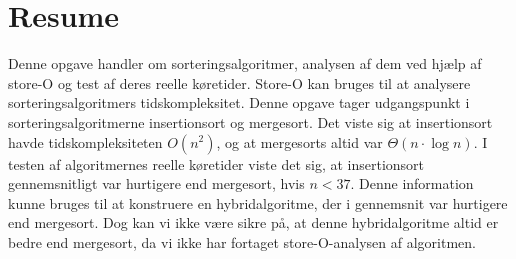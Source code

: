 \chapter*{Resume}
\label{ch:Resume}

Denne opgave handler om sorteringsalgoritmer, analysen af dem ved hjælp af store-O og test af deres reelle køretider. Store-O kan bruges til at analysere sorteringsalgoritmers tidskompleksitet. Denne opgave tager udgangspunkt i sorteringsalgoritmerne insertionsort og mergesort. Det viste sig at insertionsort havde tidskompleksiteten $O(n^2)$, og at mergesorts altid var $\Theta (n \cdot \log n)$. I testen af algoritmernes reelle køretider viste det sig, at insertionsort gennemsnitligt var hurtigere end mergesort, hvis $n < 37$. Denne information kunne bruges til at konstruere en hybridalgoritme, der i gennemsnit var hurtigere end mergesort. Dog kan vi ikke være sikre på, at denne hybridalgoritme altid er bedre end mergesort, da vi ikke har fortaget store-O-analysen af algoritmen.
